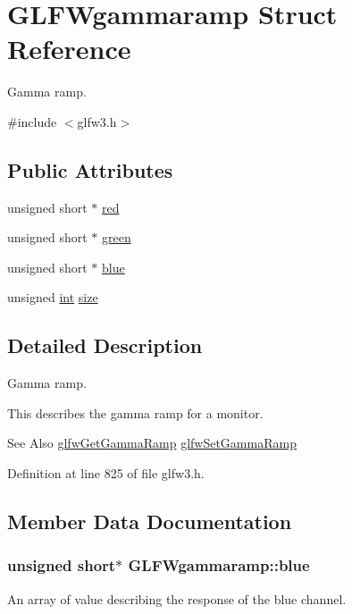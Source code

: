 \hypertarget{struct_g_l_f_wgammaramp}{\section{G\-L\-F\-Wgammaramp Struct Reference}
\label{struct_g_l_f_wgammaramp}
}


Gamma ramp.  




{\ttfamily \#include $<$glfw3.\-h$>$}

\subsection*{Public Attributes}
\begin{DoxyCompactItemize}
\item 
unsigned short $\ast$ \hyperlink{struct_g_l_f_wgammaramp_a2cce5d968734b685623eef913e635138}{red}
\item 
unsigned short $\ast$ \hyperlink{struct_g_l_f_wgammaramp_affccc6f5df47820b6562d709da3a5a3a}{green}
\item 
unsigned short $\ast$ \hyperlink{struct_g_l_f_wgammaramp_acf0c836d0efe29c392fe8d1a1042744b}{blue}
\item 
unsigned \hyperlink{wglew_8h_a500a82aecba06f4550f6849b8099ca21}{int} \hyperlink{struct_g_l_f_wgammaramp_ad620e1cffbff9a32c51bca46301b59a5}{size}
\end{DoxyCompactItemize}


\subsection{Detailed Description}
Gamma ramp. 

This describes the gamma ramp for a monitor.

\begin{DoxySeeAlso}{See Also}
\hyperlink{group__monitor_gaeeac9198f3c91b83440eed679441f76b}{glfw\-Get\-Gamma\-Ramp} \hyperlink{group__monitor_gac9f36a1cfa10eab191d3029ea8bc9558}{glfw\-Set\-Gamma\-Ramp} 
\end{DoxySeeAlso}


Definition at line 825 of file glfw3.\-h.



\subsection{Member Data Documentation}
\hypertarget{struct_g_l_f_wgammaramp_acf0c836d0efe29c392fe8d1a1042744b}{
\subsubsection[{blue}]{\setlength{\rightskip}{0pt plus 5cm}unsigned short$\ast$ G\-L\-F\-Wgammaramp\-::blue}}\label{struct_g_l_f_wgammaramp_acf0c836d0efe29c392fe8d1a1042744b}
An array of value describing the response of the blue channel. 


